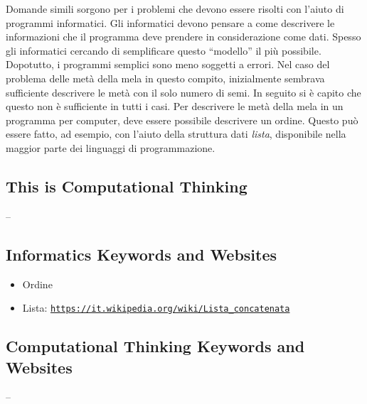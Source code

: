 \documentclass[a4paper,11pt]{report}
\newcommand{\BrochureUrlText}[1]{\texttt{#1}}
\begin{document}
Domande simili sorgono per i problemi che devono essere risolti con l’aiuto di programmi informatici. Gli informatici devono pensare a come descrivere le informazioni che il programma deve prendere in considerazione come dati. Spesso gli informatici cercando di semplificare questo \enquote{modello} il più possibile.  Dopotutto, i programmi semplici sono meno soggetti a errori. Nel caso del problema delle metà della mela in questo compito, inizialmente sembrava sufficiente descrivere le metà con il solo numero di semi. In seguito si è capito che questo non è sufficiente in tutti i casi. Per descrivere le metà della mela in un programma per computer, deve essere possibile descrivere un ordine. Questo può essere fatto, ad esempio, con l’aiuto della struttura dati \emph{lista}, disponibile nella maggior parte dei linguaggi di programmazione.


\subsection*{This is Computational Thinking}

–


\subsection*{Informatics Keywords and Websites}

\begin{itemize}
  \item Ordine
  \item Lista: \href{https://it.wikipedia.org/wiki/Lista_concatenata}{\BrochureUrlText{https://it.wikipedia.org/wiki/Lista\_concatenata}}
\end{itemize}


\subsection*{Computational Thinking Keywords and Websites}

–
\end{document}
